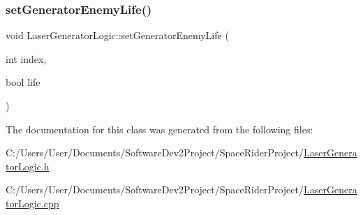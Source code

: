 \subsubsection{\texorpdfstring{set\+Generator\+Enemy\+Life()}{setGeneratorEnemyLife()}}
{\footnotesize\ttfamily void Laser\+Generator\+Logic\+::set\+Generator\+Enemy\+Life (\begin{DoxyParamCaption}\item[{int}]{index,  }\item[{bool}]{life }\end{DoxyParamCaption})}



The documentation for this class was generated from the following files\+:\begin{DoxyCompactItemize}
\item 
C\+:/\+Users/\+User/\+Documents/\+Software\+Dev2\+Project/\+Space\+Rider\+Project/\hyperlink{_laser_generator_logic_8h}{Laser\+Generator\+Logic.\+h}\item 
C\+:/\+Users/\+User/\+Documents/\+Software\+Dev2\+Project/\+Space\+Rider\+Project/\hyperlink{_laser_generator_logic_8cpp}{Laser\+Generator\+Logic.\+cpp}\end{DoxyCompactItemize}
